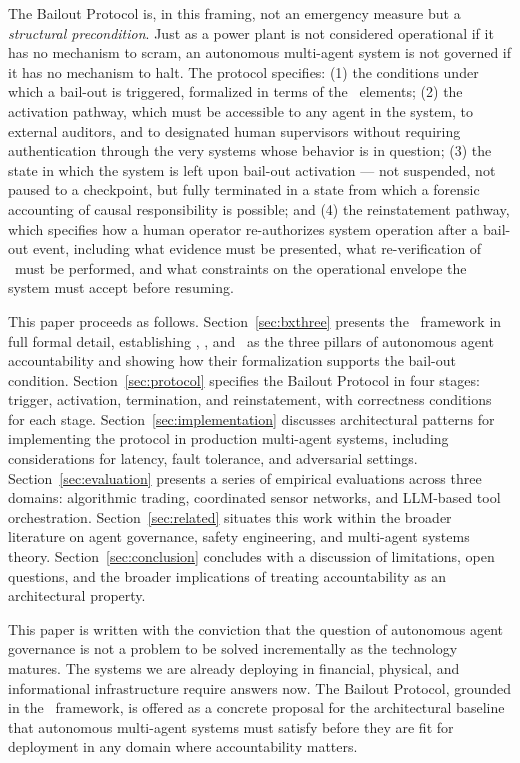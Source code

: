 The Bailout Protocol is, in this framing, not an emergency measure but a \emph{structural precondition}. Just as a power plant is not considered operational if it has no mechanism to scram, an autonomous multi-agent system is not governed if it has no mechanism to halt. The protocol specifies: (1) the conditions under which a bail-out is triggered, formalized in terms of the \bxthree\ elements; (2) the activation pathway, which must be accessible to any agent in the system, to external auditors, and to designated human supervisors without requiring authentication through the very systems whose behavior is in question; (3) the state in which the system is left upon bail-out activation — not suspended, not paused to a checkpoint, but fully terminated in a state from which a forensic accounting of causal responsibility is possible; and (4) the reinstatement pathway, which specifies how a human operator re-authorizes system operation after a bail-out event, including what evidence must be presented, what re-verification of \bounds\ must be performed, and what constraints on the operational envelope the system must accept before resuming.

This paper proceeds as follows. Section~\ref{sec:bxthree} presents the \bxthree\ framework in full formal detail, establishing \purpose, \bounds, and \fact\ as the three pillars of autonomous agent accountability and showing how their formalization supports the bail-out condition. Section~\ref{sec:protocol} specifies the Bailout Protocol in four stages: trigger, activation, termination, and reinstatement, with correctness conditions for each stage. Section~\ref{sec:implementation} discusses architectural patterns for implementing the protocol in production multi-agent systems, including considerations for latency, fault tolerance, and adversarial settings. Section~\ref{sec:evaluation} presents a series of empirical evaluations across three domains: algorithmic trading, coordinated sensor networks, and LLM-based tool orchestration. Section~\ref{sec:related} situates this work within the broader literature on agent governance, safety engineering, and multi-agent systems theory. Section~\ref{sec:conclusion} concludes with a discussion of limitations, open questions, and the broader implications of treating accountability as an architectural property.

This paper is written with the conviction that the question of autonomous agent governance is not a problem to be solved incrementally as the technology matures. The systems we are already deploying in financial, physical, and informational infrastructure require answers now. The Bailout Protocol, grounded in the \bxthree\ framework, is offered as a concrete proposal for the architectural baseline that autonomous multi-agent systems must satisfy before they are fit for deployment in any domain where accountability matters.
